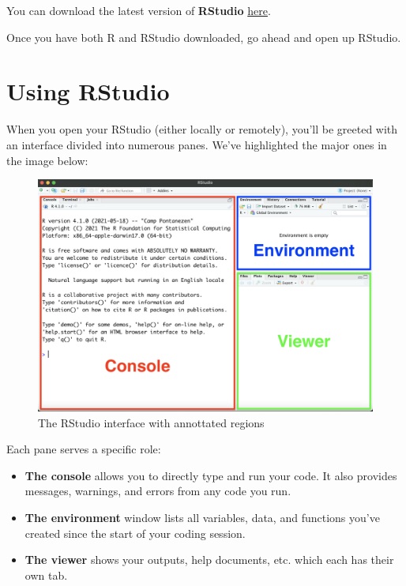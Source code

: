 \documentclass[
]{book}
\providecommand{\tightlist}{%
  \setlength{\itemsep}{0pt}\setlength{\parskip}{0pt}}
\begin{document}
You can download the latest version of \textbf{RStudio} \href{https://www.rstudio.com/products/rstudio/download/\#download}{here}.

Once you have both R and RStudio downloaded, go ahead and open up RStudio.

\hypertarget{using-rstudio}{%
\section{Using RStudio}\label{using-rstudio}}

When you open your RStudio (either locally or remotely), you'll be greeted with an interface divided into numerous panes. We've highlighted the major ones in the image below:

\begin{figure}
\centering
\includegraphics[width=1\textwidth,height=\textheight]{images/Rstudio_startup_regions.png}
\caption{The RStudio interface with annottated regions}
\end{figure}

Each pane serves a specific role:

\begin{itemize}
\tightlist
\item
  \textbf{The console} allows you to directly type and run your code. It also provides messages, warnings, and errors from any code you run.
\item
  \textbf{The environment} window lists all variables, data, and functions you've created since the start of your coding session.\\
\item
  \textbf{The viewer} shows your outputs, help documents, etc. which each has their own tab.
\end{itemize}
\end{document}
